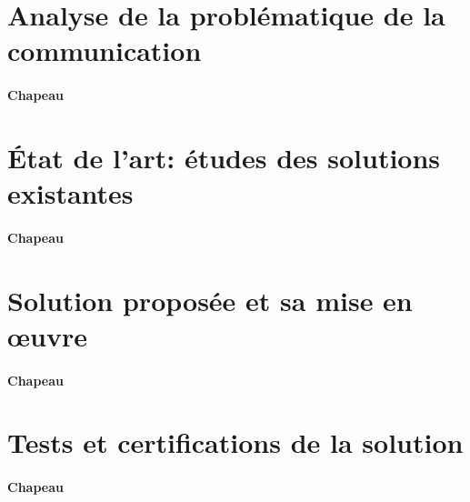 \section{Analyse de la problématique de la communication} \label{sec:ProblematiqueCommunication}

\paragraph{Chapeau}


\section{État de l’art: études des solutions existantes} \label{sec:etatDeLart5}

\paragraph{Chapeau}


\section{Solution proposée et sa mise en œuvre} \label{sec:solution5}

\paragraph{Chapeau}


\section{Tests et certifications de la solution} \label{sec:test5}

\paragraph{Chapeau}
